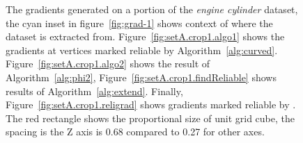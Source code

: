 \begin{figure}
    \centering
\caption{The gradients generated on a portion of the \textit{engine cylinder} dataset, the cyan inset  in figure~\ref{fig:grad-1} shows context of where the dataset is extracted from. Figure~\ref{fig:setA.crop1.algo1} shows the gradients at vertices marked reliable by Algorithm~\ref{alg:curved}. Figure~\ref{fig:setA.crop1.algo2} shows the result of Algorithm~\ref{alg:phi2}, Figure~\ref{fig:setA.crop1.findReliable} shows results of Algorithm~\ref{alg:extend}. Finally, Figure~\ref{fig:setA.crop1.religrad} shows gradients marked reliable by \protect\ReliGrad. The red rectangle shows the proportional size of unit grid cube, the spacing is the Z axis is 0.68 compared to 0.27 for other axes. } 
\label{fig:setA.crop1.grads}
\end{figure}
